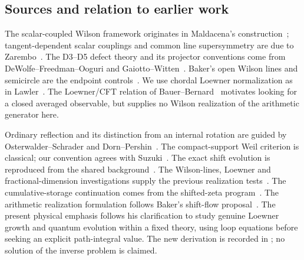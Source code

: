 \subsection{Sources and relation to earlier work}

The scalar-coupled Wilson framework originates in
Maldacena's construction~\cite{Maldacena}; tangent-dependent scalar
couplings and common line supersymmetry are due to
Zarembo~\cite{Zarembo}. The D3--D5 defect theory and its projector
conventions come from DeWolfe--Freedman--Ooguri and
Gaiotto--Witten~\cite{DFO,GW}. Baker's open Wilson lines and
semicircle are the endpoint controls~\cite{Baker}.
We use chordal Loewner normalization as in Lawler~\cite{Lawler}.
The Loewner/CFT relation of Bauer--Bernard~\cite{BauerBernard}
motivates looking for a closed averaged observable, but supplies
no Wilson realization of the arithmetic generator here.

Ordinary reflection and its distinction from an internal rotation
are guided by Osterwalder--Schrader and
Dorn--Pershin~\cite{OS,DP}. The compact-support Weil criterion is
classical; our convention agrees with Suzuki~\cite{Suzuki}.
The exact shift evolution is reproduced from the shared
background~\cite{SharedBackground}. The Wilson-lines, Loewner and
fractional-dimension investigations supply the previous realization
tests~\cite{ParentWilson,ParentLoewner,ParentFractional}.
The cumulative-storage continuation comes from the shifted-zeta
program~\cite{CumulativePath,AdaptivePath}. The arithmetic realization formulation follows Baker's shift-flow
proposal~\cite{ShiftFlowNote}. The present physical emphasis follows
his clarification to study genuine Loewner growth and quantum evolution
within a fixed theory, using loop equations before seeking an explicit
path-integral value. The new derivation is recorded in
\cite{GrowingTraceNote}; no solution of the inverse problem is claimed.
